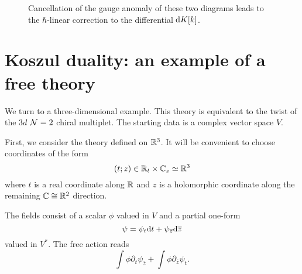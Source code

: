 \documentclass[11pt]{amsart}
\def\zbar{{\overline{z}}}
\def\brian#1{{\textcolor{blue!65!red}{BRW: {#1}}}}
\begin{document}
\begin{figure}
	\caption{Cancellation of the gauge anomaly of these two diagrams leads to the $\hbar$-linear correction to the differential ${\rm d} K[k]$.
	\label{fig:cancel4}}
\end{figure}


\section{Koszul duality: an example of a free theory}


We turn to a three-dimensional example. 
This theory is equivalent to the twist of the $3d$ $\mathcal N=2$ chiral multiplet. 
The starting data is a complex vector space $V$.

First, we consider the theory defined on $\mathbb R^3$. 
It will be convenient to choose coordinates of the form
\[
(t ; z) \in \mathbb R_t \times \mathbb C_z \simeq \mathbb R^3
\]
where $t$ is a real coordinate along $\mathbb R$ and $z$ is a holomorphic coordinate along the remaining $\mathbb C \cong \mathbb R^2$ direction. 

The fields consist of a scalar $\phi$ valued in $V$ and a partial one-form 
\[
\psi = \psi_t \d t + \psi_\zbar \d \zbar 
\]
valued in $V^*$. 
The free action reads
\[
\int \phi \partial_t \psi_\zbar + \int \phi \partial_\zbar \psi_t .
\]
\end{document}
